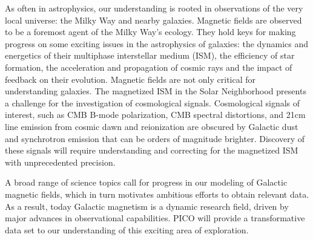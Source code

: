 \documentclass[PICOReport.tex]{subfiles}
\begin{document}
As often in astrophysics, our understanding is rooted in 
observations of the very local universe: the Milky Way and nearby galaxies. Magnetic fields are observed to be a foremost agent of the 
Milky Way's ecology. They hold keys for making progress on some exciting issues in the astrophysics of galaxies: the dynamics and 
energetics of their multiphase interstellar medium (ISM), the efficiency of star formation, the acceleration and propagation of cosmic rays and the 
impact of feedback on their evolution. Magnetic fields are not only critical for understanding galaxies. 
The magnetized ISM in the Solar Neighborhood presents a challenge for the investigation of cosmological signals. 
Cosmological signals of interest, such as CMB B-mode polarization, CMB spectral distortions, and 21cm line emission from cosmic dawn and reionization are obscured by Galactic dust and synchrotron emission that can be orders of magnitude brighter. Discovery of these signals will require understanding and correcting for the magnetized ISM with unprecedented precision.  

A broad range of science topics call for progress in our modeling of Galactic magnetic fields, which in turn 
motivates ambitious efforts to obtain relevant data. 
As a result, today Galactic magnetism is a dynamic research field, driven by major advances in observational capabilities. PICO will provide a transformative data set to our understanding of this exciting area of exploration.
\end{document}

